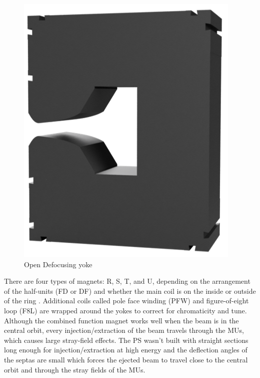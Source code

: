 \documentclass[a4paper,
               biblatex,     %
               keeplastbox,   %
               ]{jacow}
\begin{document}
\begin{figure}[!htb]
  \hfill
  \begin{minipage}[b]{0.45\columnwidth}
    \includegraphics*[width=\textwidth]{defocusing}
    \caption{Open Defocusing yoke}
    \label{fig:defocusing}
  \end{minipage}
\end{figure}

There are four types of magnets: R, S, T, and U, depending on the arrangement of the half-units (FD or DF) and whether the main coil is on the inside or outside of the ring \cite{steerenberg_fifty_2011}. Additional coils called pole face winding (PFW) and figure-of-eight loop (F8L) are wrapped around the yokes to correct for chromaticity and tune. Although the combined function magnet works well when the beam is in the central orbit, every injection/extraction of the beam travels through the MUs, which causes large stray-field effects. The PS wasn't built with straight sections long enough for injection/extraction at high energy and the deflection angles of the septas are small which forces the ejected beam to travel close to the central orbit and through the stray fields of the MUs. \cite{risselada_beam_nodate}
\end{document}
